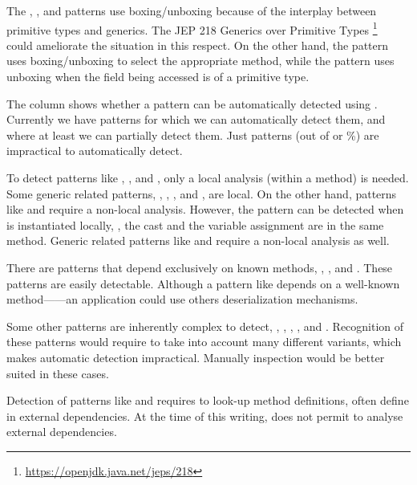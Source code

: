 The
,
, and
patterns use boxing/unboxing because of the interplay between primitive types and generics.
The JEP 218 Generics over Primitive Types%
\footnote{\url{https://openjdk.java.net/jeps/218}}~\citep{jep218}
could ameliorate the situation in this respect.
On the other hand, 
the  pattern uses boxing/unboxing to select the appropriate method,
while the  pattern
uses unboxing when the field being accessed is of a primitive type.

The \gh{\ql{}} column shows whether a pattern can be automatically detected using \ql{}.
Currently we have \nCmarkCount{} patterns for which we can automatically detect them, and
\nExisCount{} where at least we can partially detect them.
Just \nXmarkCount{} patterns (out of \nPattern{} or \nXmarkPerc{}\%) are impractical to automatically detect.

To detect patterns like
,
, and
,
only a local analysis (within a method) is needed.
Some generic related patterns, \eg{},
,
, and
,
are local.
On the other hand,
patterns like  and
 require a non-local analysis.
However, the  pattern can be detected when
is instantiated locally, \ie{},
the cast and the variable assignment are in the same method.
Generic related patterns like  and  require a non-local analysis as well.

There are patterns that depend exclusively on known methods, \eg{},
, and
.
These patterns are easily detectable.
Although a pattern like  depends on a well-known method------an application could use others deserialization mechanisms.

Some other patterns are inherently complex to detect, \eg{},
,
,
, and
.
Recognition of these patterns would require to take into account many different variants,
which makes automatic detection impractical.
Manually inspection would be better suited in these cases. 

Detection of patterns like  and  requires to look-up method definitions,
often define in external dependencies.
At the time of this writing, \ql{} does not permit to analyse external dependencies.
